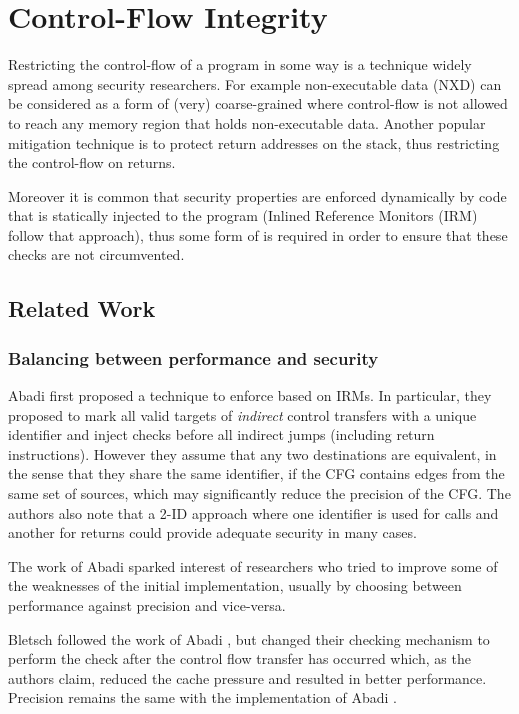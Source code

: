 \chapter{Control-Flow Integrity}\label{ch:cfi}

Restricting the control-flow of a program in some way is a technique widely
spread among security researchers. For example non-executable data (NXD)
can be considered as a form of (very) coarse-grained \CFI where control-flow is
not allowed to reach any memory region that holds non-executable data. Another
popular mitigation technique is to protect return addresses on the stack,
thus restricting the control-flow on returns.

Moreover it is common that security properties are enforced dynamically by code
that is statically injected to the program (\EG Inlined Reference Monitors (IRM)
\cite{Erlingsson04} follow that approach), thus some form of \CFI is required in
order to ensure that these checks are not circumvented.

\section{Related Work}

\subsection{Balancing between performance and security}\label{sec:security_cfi}

Abadi \ETAL first proposed a technique to enforce \CFI based on IRMs.
In particular, they proposed to mark all valid targets of \emph{indirect}
control transfers with a unique identifier and inject checks before all
indirect jumps (including return instructions). However they assume that any
two destinations are equivalent, in the sense that they share the same
identifier, if the CFG contains edges from the same  set of sources, which may
significantly reduce the precision of the CFG.
The authors also note that a 2-ID approach where one identifier is used for
calls and another for returns could provide adequate security in many cases.

The work of Abadi \ETAL sparked interest of researchers who tried to improve
some of the weaknesses of the initial implementation, usually by choosing
between performance against precision and vice-versa.

Bletsch \ETAL \cite{Bletsch:2011:MCA:2076732.2076783} followed the work
of Abadi \ETAL, but changed their checking mechanism to perform the check
after the control flow transfer has occurred which, as the authors claim,
reduced the cache pressure and resulted in better performance. Precision remains
the same with the implementation of Abadi \ETAL.

